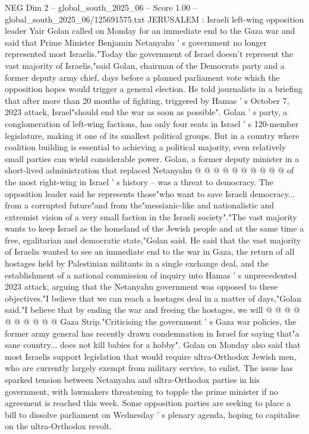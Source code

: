 \begin{textsample}{NEG Dim 2 – global\_south\_2025\_06 – Score 1.00 – global\_south\_2025\_06/125691575.txt}  \label{ex:f2_neg_363}
JERUSALEM : Israeli left-wing opposition leader Yair Golan called on Monday for an immediate end to the Gaza war and said that Prime Minister Benjamin Netanyahu ' s government no longer represented most Israelis."Today the government of Israel doesn't represent the vast majority of Israelis,"said Golan, chairman of the Democrats party and a former deputy army chief, days before a planned parliament vote which the opposition hopes would trigger a general election.
He told journalists in a briefing that after more than 20 months of fighting, triggered by Hamas ' s October 7, 2023 attack, Israel"should end the war as soon as possible".
Golan ' s party, a conglomeration of left-wing factions, has only four seats in Israel ' s 120-member legislature, making it one of its smallest political groups.
But in a country where coalition building is essential to achieving a political majority, even relatively small parties can wield considerable power.
Golan, a former deputy minister in a short-lived administration that replaced Netanyahu @ @ @ @ @ @ @ @ @ @ of the most right-wing in Israel ' s history -- was a threat to democracy.
The opposition leader said he represents those"who want to save Israeli democracy... from a corrupted future"and from the"messianic-like and nationalistic and extremist vision of a very small faction in the Israeli society"."The vast majority wants to keep Israel as the homeland of the Jewish people and at the same time a free, egalitarian and democratic state,"Golan said.
He said that the vast majority of Israelis wanted to see an immediate end to the war in Gaza, the return of all hostages held by Palestinian militants in a single exchange deal, and the establishment of a national commission of inquiry into Hamas ' s unprecedented 2023 attack, arguing that the Netanyahu government was opposed to these objectives."I believe that we can reach a hostages deal in a matter of days,"Golan said."I believe that by ending the war and freeing the hostages, we will @ @ @ @ @ @ @ @ @ @ Gaza Strip."Criticising the government ' s Gaza war policies, the former army general has recently drawn condemnation in Israel for saying that"a sane country... does not kill babies for a hobby".
Golan on Monday also said that most Israelis support legislation that would require ultra-Orthodox Jewish men, who are currently largely exempt from military service, to enlist.
The issue has sparked tension between Netanyahu and ultra-Orthodox parties in his government, with lawmakers threatening to topple the prime minister if no agreement is reached this week.
Some opposition parties are seeking to place a bill to dissolve parliament on Wednesday ' s plenary agenda, hoping to capitalise on the ultra-Orthodox revolt.

\end{textsample}
